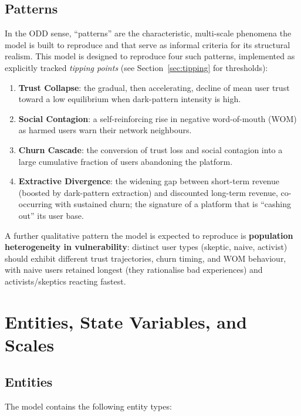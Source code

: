 \documentclass[11pt]{article}
\begin{document}
\subsection{Patterns}

In the ODD sense, ``patterns'' are the characteristic, multi-scale phenomena the
model is built to reproduce and that serve as informal criteria for its
structural realism. This model is designed to reproduce four such patterns,
implemented as explicitly tracked \emph{tipping points} (see
Section~\ref{sec:tipping} for thresholds):

\begin{enumerate}
  \item \textbf{Trust Collapse}: the gradual, then accelerating, decline of
  mean user trust toward a low equilibrium when dark-pattern intensity is high.
  \item \textbf{Social Contagion}: a self-reinforcing rise in negative
  word-of-mouth (WOM) as harmed users warn their network neighbours.
  \item \textbf{Churn Cascade}: the conversion of trust loss and social
  contagion into a large cumulative fraction of users abandoning the platform.
  \item \textbf{Extractive Divergence}: the widening gap between short-term
  revenue (boosted by dark-pattern extraction) and discounted long-term revenue,
  co-occurring with sustained churn; the signature of a platform that is
  ``cashing out'' its user base.
\end{enumerate}

A further qualitative pattern the model is expected to reproduce is
\textbf{population heterogeneity in vulnerability}: distinct user types (skeptic,
naive, activist) should exhibit different trust trajectories, churn timing, and
WOM behaviour, with naive users retained longest (they rationalise bad
experiences) and activists/skeptics reacting fastest.

\section{Entities, State Variables, and Scales}
\label{sec:entities}

\subsection{Entities}

The model contains the following entity types:
\end{document}
